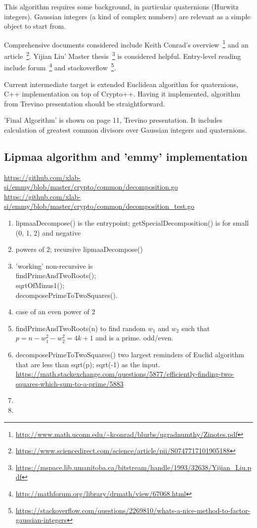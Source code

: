 \documentclass[a4paper,12pt]{article}
\begin{document}
This algorithm requires some background, in particular quaternions (Hurwitz integers).
Gaussian integers (a kind of complex numbers) are relevant as a simple object to start from.

Comprehensive documents considered include
Keith Conrad's overview~\footnote{\url{http://www.math.uconn.edu/~kconrad/blurbs/ugradnumthy/Zinotes.pdf}}
and an article~\footnote{\url{https://www.sciencedirect.com/science/article/pii/S0747717101905188}}.
%
Yijian Liu' Master thesis~\footnote{\url{https://mspace.lib.umanitoba.ca/bitstream/handle/1993/32638/Yijian_Liu.pdf}} is considered helpful.
%
Entry-level reading include
forum~\footnote{\url{http://mathforum.org/library/drmath/view/67068.html}}
and stackoverflow~\footnote{\url{https://stackoverflow.com/questions/2269810/whats-a-nice-method-to-factor-gaussian-integers}}.

Current intermediate target is extended Euclidean algorithm for quaternions, C++ implementation on top of Crypto++.
Having it implemented, algorithm from Trevino presentation should be straightforward.

'Final Algorithm' is shown on page 11, Trevino presentation.
It includes calculation of greatest common divisors over Gaussian integers and quaternions.

\subsection{Lipmaa algorithm and 'emmy' implementation}

\noindent
\url{https://github.com/xlab-si/emmy/blob/master/crypto/common/decomposition.go} \\
\url{https://github.com/xlab-si/emmy/blob/master/crypto/common/decomposition_test.go}

\begin{enumerate}
\item
lipmaaDecompose() is the entrypoint;
getSpecialDecomposition() is for small (0, 1, 2) and negative

\item
powers of 2; recursive lipmaaDecompose()

\item
'working' non-recursive is\\
findPrimeAndTwoRoots();\\
sqrtOfMinus1();\\
decomposePrimeToTwoSquares().

\item
case of an even power of 2

\item
findPrimeAndTwoRoots(n) to find random $w_1$ and $w_2$ such that
$p = n - w_1^2 - w_2^2 = 4 k + 1$ and is a prime.
odd/even.

\item
decomposePrimeToTwoSquares() two largest reminders of Euclid algorithm that are less than sqrt(p);
sqrt(-1) as the input.
\url{https://math.stackexchange.com/questions/5877/efficiently-finding-two-squares-which-sum-to-a-prime/5883}

\item
\item
\end{enumerate}
\end{document}
